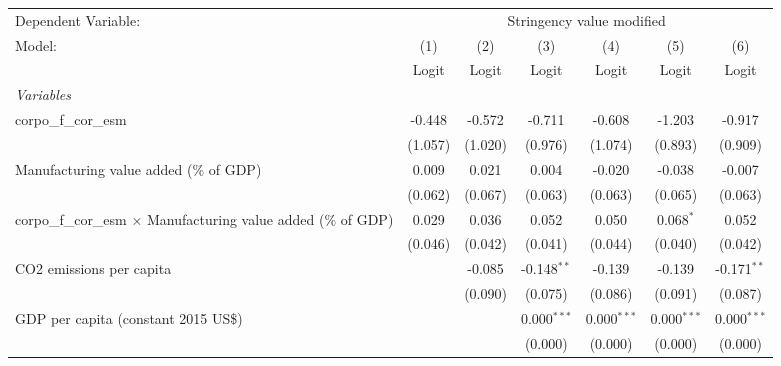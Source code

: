 
\begingroup
\centering
\begin{tabular}{lcccccc}
   \toprule
   Dependent Variable: & \multicolumn{6}{c}{Stringency value modified}\\
   Model:                                                                 & (1)     & (2)     & (3)           & (4)           & (5)           & (6)\\  
                                                                          &  Logit  & Logit   & Logit         & Logit         & Logit         & Logit\\  
   \midrule
   \emph{Variables}\\
   corpo\_f\_cor\_esm                                                     & -0.448  & -0.572  & -0.711        & -0.608        & -1.203        & -0.917\\   
                                                                          & (1.057) & (1.020) & (0.976)       & (1.074)       & (0.893)       & (0.909)\\   
   Manufacturing value added (\% of GDP)                                  & 0.009   & 0.021   & 0.004         & -0.020        & -0.038        & -0.007\\   
                                                                          & (0.062) & (0.067) & (0.063)       & (0.063)       & (0.065)       & (0.063)\\   
   corpo\_f\_cor\_esm $\times$ Manufacturing value added (\% of GDP)      & 0.029   & 0.036   & 0.052         & 0.050         & 0.068$^{*}$   & 0.052\\   
                                                                          & (0.046) & (0.042) & (0.041)       & (0.044)       & (0.040)       & (0.042)\\   
   CO2 emissions per capita                                               &         & -0.085  & -0.148$^{**}$ & -0.139        & -0.139        & -0.171$^{**}$\\   
                                                                          &         & (0.090) & (0.075)       & (0.086)       & (0.091)       & (0.087)\\   
   GDP per capita (constant 2015 US\$)                                    &         &         & 0.000$^{***}$ & 0.000$^{***}$ & 0.000$^{***}$ & 0.000$^{***}$\\   
                                                                          &         &         & (0.000)       & (0.000)       & (0.000)       & (0.000)\\   

\end{tabular}
